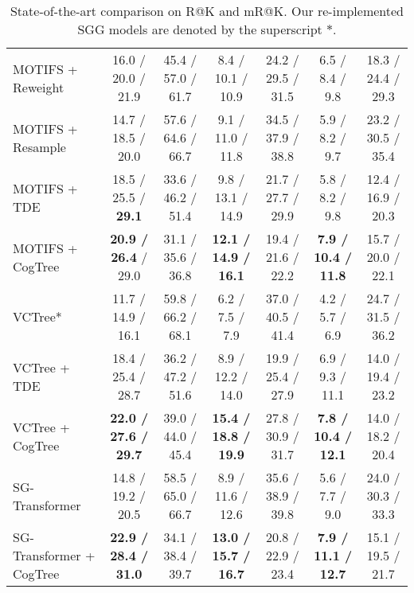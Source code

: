 \documentclass{article}
\begin{document}
\begin{table*}[!ht]
{\begin{tabular}{lcccccc}
\multicolumn{1}{l|}{MOTIFS + Reweight}        & 16.0 / 20.0 / 21.9          &\multicolumn{1}{c|}{ 45.4 / 57.0 / 61.7 }  & 8.4  / 10.1 / 10.9          & \multicolumn{1}{c|}{24.2 / 29.5 / 31.5}  & 6.5 /  8.4  / 9.8          &18.3 / 24.4 / 29.3   \\
\multicolumn{1}{l|}{MOTIFS + Resample}        & 14.7 / 18.5 / 20.0          &\multicolumn{1}{c|}{ 57.6 / 64.6 / 66.7 }  & 9.1  / 11.0 / 11.8          & \multicolumn{1}{c|}{34.5 / 37.9 / 38.8}  & 5.9 /  8.2  / 9.7          &23.2 / 30.5 / 35.4   \\
\multicolumn{1}{l|}{MOTIFS + TDE}             & 18.5 / 25.5 / \textbf{29.1}          &\multicolumn{1}{c|}{ 33.6 / 46.2 / 51.4 }  & 9.8  / 13.1 / 14.9          & \multicolumn{1}{c|}{21.7 / 27.7 / 29.9}  & 5.8 /  8.2  / 9.8          &12.4 / 16.9 / 20.3   \\
\multicolumn{1}{l|}{MOTIFS + CogTree}         & \textbf{20.9 / 26.4} / 29.0 &\multicolumn{1}{c|}{ 31.1 / 35.6 / 36.8 }  & \textbf{12.1 / 14.9 / 16.1} & \multicolumn{1}{c|}{19.4 / 21.6 / 22.2}  & \textbf{7.9 / 10.4 / 11.8} &15.7 / 20.0 / 22.1   \\ \hline
\multicolumn{1}{l|}{VCTree*}                  & 11.7 / 14.9 / 16.1          &\multicolumn{1}{c|}{ 59.8 / 66.2 / 68.1 }  & 6.2  /  7.5  / 7.9          & \multicolumn{1}{c|}{37.0 / 40.5 / 41.4}  & 4.2 /  5.7  / 6.9          &24.7 / 31.5 / 36.2   \\
\multicolumn{1}{l|}{VCTree + TDE}             & 18.4 / 25.4 / 28.7          &\multicolumn{1}{c|}{ 36.2 / 47.2 / 51.6 }  & 8.9  / 12.2 / 14.0          & \multicolumn{1}{c|}{19.9 / 25.4 / 27.9}  & 6.9 /  9.3  / 11.1         &14.0 / 19.4 / 23.2   \\
\multicolumn{1}{l|}{VCTree + CogTree}         & \textbf{22.0 / 27.6 / 29.7} &\multicolumn{1}{c|}{ 39.0 / 44.0 / 45.4 }  & \textbf{15.4 / 18.8 / 19.9} & \multicolumn{1}{c|}{27.8 / 30.9 / 31.7}  & \textbf{7.8 / 10.4 / 12.1} &14.0 / 18.2 / 20.4   \\ \hline
\multicolumn{1}{l|}{SG-Transformer}           & 14.8 / 19.2 / 20.5          &\multicolumn{1}{c|}{ 58.5 / 65.0 / 66.7 }  & 8.9  / 11.6 / 12.6          & \multicolumn{1}{c|}{35.6 / 38.9 / 39.8}  & 5.6 /  7.7  / 9.0          &24.0 / 30.3 / 33.3   \\
\multicolumn{1}{l|}{SG-Transformer + CogTree} & \textbf{22.9 / 28.4 / 31.0} &\multicolumn{1}{c|}{ 34.1 / 38.4 / 39.7 }  & \textbf{13.0 / 15.7 / 16.7} & \multicolumn{1}{c|}{20.8 / 22.9 / 23.4}  & \textbf{7.9 / 11.1 / 12.7} &15.1 / 19.5 / 21.7   \\ \hline
\end{tabular}}    
\caption{State-of-the-art comparison on R@K and mR@K. Our re-implemented SGG models are denoted by the superscript $*$.}
\label{tab:sota}
\end{table*}
\end{document}

